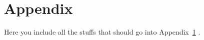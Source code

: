 \chapter{Appendix}\label{appdx}

Here you include all the stuffs that should go into Appendix~\ref{appdx} \citep{1998SSRv...84..327C}.


